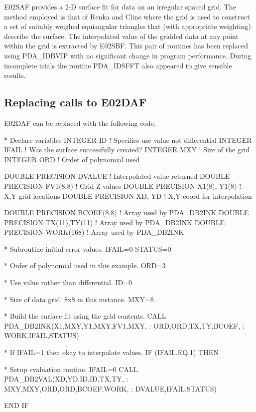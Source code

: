 \documentclass[11pt,twoside,nolof]{starlink}
\begin{document}
E02SAF provides a 2-D surface fit for data on an
irregular spaced grid. The method employed is that of Renka and
Cline where the grid is used to construct a set of suitably
weighed equiangular triangles that (with appropriate weighting)
describe the surface. The interpolated value of the gridded data
at any point within the grid is extracted by E02SBF. This pair of
routines has been replaced using PDA\_IDBVIP with no significant change
in program performance. During incomplete trials the routine PDA\_IDSFFT
also appeared to give sensible results.

\subsection{Replacing calls to E02DAF}

E02DAF can be replaced with the following code.

\begin{terminalv}
*   Declare variables
      INTEGER ID                      ! Specifies use value not differential
      INTEGER IFAIL                   ! Was the surface successfully created?
      INTEGER MXY                     ! Size of the grid
      INTEGER ORD                     ! Order of polynomial used

      DOUBLE PRECISION DVALUE         ! Interpolated value returned
      DOUBLE PRECISION FV1(8,8)       ! Grid Z values
      DOUBLE PRECISION X1(8), Y1(8)   ! X,Y grid locations
      DOUBLE PRECISION XD, YD         ! X,Y coord for interpolation

      DOUBLE PRECISION BCOEF(8,8)     ! Array used by PDA_DB2INK
      DOUBLE PRECISION TX(11),TY(11)  ! Array used by PDA_DB2INK
      DOUBLE PRECISION WORK(168)      ! Array used by PDA_DB2INK

*   Subroutine initial error values.
      IFAIL=0
      STATUS=0

*   Order of polynomial used in this example.
      ORD=3

*   Use value rather than differential.
      ID=0

*   Size of data grid. 8x8 in this instance.
      MXY=8

*   Build the surface fit using the grid contents.
      CALL PDA_DB2INK(X1,MXY,Y1,MXY,FV1,MXY,
     :                ORD,ORD,TX,TY,BCOEF,
     :                WORK,IFAIL,STATUS)


*   If IFAIL=1 then okay to interpolate values.
      IF (IFAIL.EQ.1) THEN

*       Setup evaluation routine.
          IFAIL=0
          CALL PDA_DB2VAL(XD,YD,ID,ID,TX,TY,
     :                    MXY,MXY,ORD,ORD,BCOEF,WORK,
     :                    DVALUE,IFAIL,STATUS)

      END IF
\end{terminalv}
\end{document}
